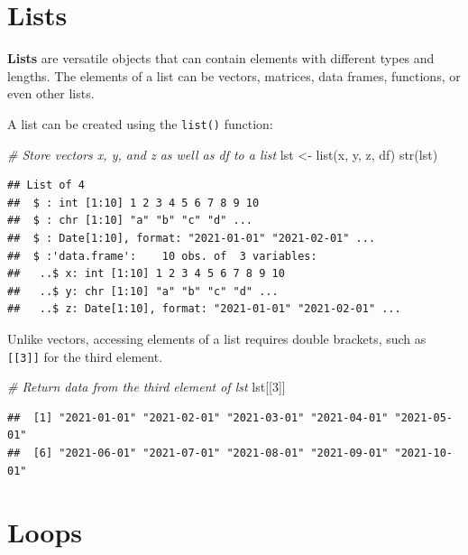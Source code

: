 \documentclass[
]{book}
\newenvironment{Shaded}{\begin{snugshade}}{\end{snugshade}}
\newcommand{\CommentTok}[1]{\textcolor[rgb]{0.56,0.35,0.01}{\textit{#1}}}
\newcommand{\DecValTok}[1]{\textcolor[rgb]{0.00,0.00,0.81}{#1}}
\newcommand{\FunctionTok}[1]{\textcolor[rgb]{0.00,0.00,0.00}{#1}}
\newcommand{\NormalTok}[1]{#1}
\newcommand{\OtherTok}[1]{\textcolor[rgb]{0.56,0.35,0.01}{#1}}
\begin{document}
\hypertarget{lists}{%
\section{Lists}\label{lists}}

\textbf{Lists} are versatile objects that can contain elements with different types and lengths. The elements of a list can be vectors, matrices, data frames, functions, or even other lists.

A list can be created using the \texttt{list()} function:

\begin{Shaded}
\begin{Highlighting}[]
\CommentTok{\# Store vectors x, y, and z as well as df to a list}
\NormalTok{lst }\OtherTok{\textless{}{-}} \FunctionTok{list}\NormalTok{(x, y, z, df)}
\FunctionTok{str}\NormalTok{(lst)}
\end{Highlighting}
\end{Shaded}

\begin{verbatim}
## List of 4
##  $ : int [1:10] 1 2 3 4 5 6 7 8 9 10
##  $ : chr [1:10] "a" "b" "c" "d" ...
##  $ : Date[1:10], format: "2021-01-01" "2021-02-01" ...
##  $ :'data.frame':    10 obs. of  3 variables:
##   ..$ x: int [1:10] 1 2 3 4 5 6 7 8 9 10
##   ..$ y: chr [1:10] "a" "b" "c" "d" ...
##   ..$ z: Date[1:10], format: "2021-01-01" "2021-02-01" ...
\end{verbatim}

Unlike vectors, accessing elements of a list requires double brackets, such as \texttt{{[}{[}3{]}{]}} for the third element.

\begin{Shaded}
\begin{Highlighting}[]
\CommentTok{\# Return data from the third element of lst}
\NormalTok{lst[[}\DecValTok{3}\NormalTok{]]}
\end{Highlighting}
\end{Shaded}

\begin{verbatim}
##  [1] "2021-01-01" "2021-02-01" "2021-03-01" "2021-04-01" "2021-05-01"
##  [6] "2021-06-01" "2021-07-01" "2021-08-01" "2021-09-01" "2021-10-01"
\end{verbatim}

\hypertarget{loops}{%
\section{Loops}\label{loops}}
\end{document}
